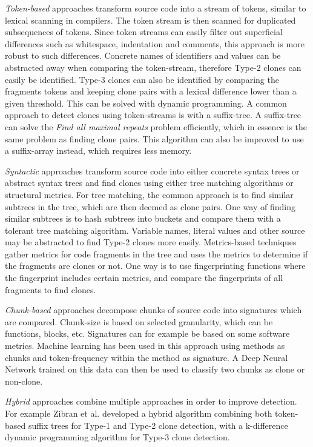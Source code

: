 \documentclass[12pt]{article}
\begin{document}
\textit{Token-based} approaches transform source code into a stream of tokens, similar to
lexical scanning in compilers. The token stream is then scanned for duplicated
subsequences of tokens. Since token streams can easily filter out superficial differences
such as whitespace, indentation and comments, this approach is more robust to such
differences. Concrete names of identifiers and values can be abstracted away when comparing
the token-stream, therefore Type-2 clones can easily be identified. Type-3 clones can also
be identified by comparing the fragments tokens and keeping clone pairs with a lexical
difference lower than a given threshold. This can be solved with dynamic
programming\cite{BakerSparseDynamicProgramming}. A common approach to detect clones using
token-streams is with a suffix-tree. A suffix-tree can solve the \textit{Find all maximal
	repeats} problem efficiently, which in essence is the same problem as finding clone pairs.
This algorithm can also be improved to use a suffix-array instead, which requires less
memory.

\textit{Syntactic} approaches transform source code into either concrete syntax trees or
abstract syntax trees and find clones using either tree matching algorithms or structural
metrics. For tree matching, the common approach is to find similar subtrees in the tree,
which are then deemed as clone pairs. One way of finding similar subtrees is to hash
subtrees into buckets and compare them with a tolerant tree matching algorithm. Variable
names, literal values and other source may be abstracted to find Type-2 clones more
easily. Metrics-based techniques gather metrics for code fragments in the tree and uses
the metrics to determine if the fragments are clones or not. One way is to use
fingerprinting functions where the fingerprint includes certain metrics, and compare the
fingerprints of all fragments to find clones.

\textit{Chunk-based} approaches decompose chunks of source code into signatures which are
compared. Chunk-size is based on selected granularity, which can be functions, blocks,
etc. Signatures can for example be based on some software metrics. Machine learning has
been used in this approach using methods as chunks and token-frequency within the method
as signature. A Deep Neural Network trained on this data can then be used to classify two
chunks as clone or non-clone.

\textit{Hybrid} approaches combine multiple approaches in order to improve detection. For
example Zibran et al.\cite{Zibran_real_time_search} developed a hybrid algorithm
combining both token-based suffix trees for Type-1 and Type-2 clone detection, with
a k-difference dynamic programming algorithm for Type-3 clone detection.
\end{document}
